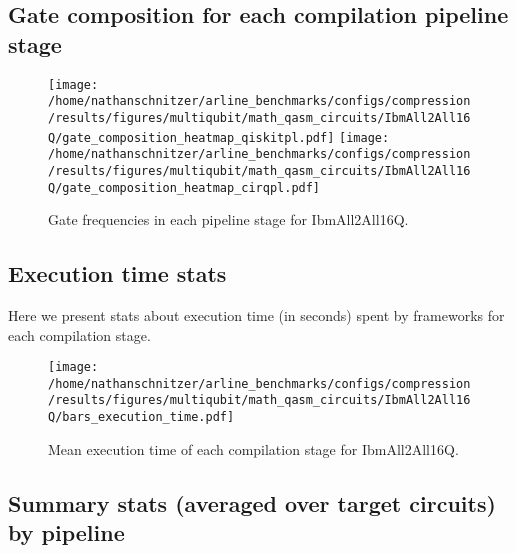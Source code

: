 \documentclass{report}%
\begin{document}
%
\clearpage%
\subsection*{Gate composition for each compilation pipeline stage}%
\label{subsec:Gatecompositionforeachcompilationpipelinestage}%

%


\begin{figure}[h!]%
\centering%
\texttt{[image: /home/nathanschnitzer/arline\_benchmarks/configs/compression/results/figures/multiqubit/math\_qasm\_circuits/IbmAll2All16Q/gate\_composition\_heatmap\_qiskitpl.pdf]}%
\centering%
\texttt{[image: /home/nathanschnitzer/arline\_benchmarks/configs/compression/results/figures/multiqubit/math\_qasm\_circuits/IbmAll2All16Q/gate\_composition\_heatmap\_cirqpl.pdf]}%
\linebreak%
\caption{Gate frequencies in each pipeline stage for IbmAll2All16Q.}%
\end{figure}

%
\subsection*{Execution time stats }%
\label{subsec:Executiontimestats}%

%
Here we present stats about execution time (in seconds)
                spent by frameworks for each compilation stage.%


\begin{figure}[h!]%
\centering%
\texttt{[image: /home/nathanschnitzer/arline\_benchmarks/configs/compression/results/figures/multiqubit/math\_qasm\_circuits/IbmAll2All16Q/bars\_execution\_time.pdf]}%
\caption{Mean execution time of each compilation stage for IbmAll2All16Q.}%
\end{figure}

%
\subsection*{Summary stats (averaged over target circuits) by pipeline}%
\label{subsec:Summarystats(averagedovertargetcircuits)bypipeline}%
\end{document}
